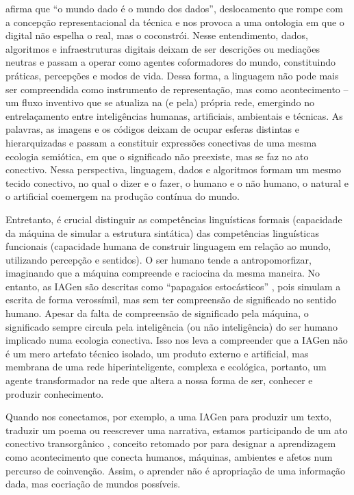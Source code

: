 \documentclass[portuguese]{textolivre}
\begin{document}
\textcite{accoto2020mundodado} afirma que “o mundo dado é o mundo dos dados”, deslocamento que rompe com a concepção representacional da técnica e nos provoca a uma ontologia em que o digital não espelha o real, mas o coconstrói. Nesse entendimento, dados, algoritmos e infraestruturas digitais deixam de ser descrições ou mediações neutras e passam a operar como agentes coformadores do mundo, constituindo práticas, percepções e modos de vida. Dessa forma, a linguagem não pode mais ser compreendida como instrumento de representação, mas como acontecimento – um fluxo inventivo que se atualiza na (e pela) própria rede, emergindo no entrelaçamento entre inteligências humanas, artificiais, ambientais e técnicas. As palavras, as imagens e os códigos deixam de ocupar esferas distintas e hierarquizadas e passam a constituir expressões conectivas de uma mesma ecologia semiótica, em que o significado não preexiste, mas se faz no ato conectivo. Nessa perspectiva, linguagem, dados e algoritmos formam um mesmo tecido conectivo, no qual o dizer e o fazer, o humano e o não humano, o natural e o artificial coemergem na produção contínua do mundo.

Entretanto, é crucial distinguir as competências linguísticas formais (capacidade da máquina de simular a estrutura sintática) das competências linguísticas funcionais (capacidade humana de construir linguagem em relação ao mundo, utilizando percepção e sentidos). O ser humano tende a antropomorfizar, imaginando que a máquina compreende e raciocina da mesma maneira. No entanto, as IAGen são descritas como “papagaios estocásticos” \cite{bender2021stochasticparrots}, pois simulam a escrita de forma verossímil, mas sem ter compreensão de significado no sentido humano. Apesar da falta de compreensão de significado pela máquina, o significado sempre circula pela inteligência (ou não inteligência) do ser humano implicado numa ecologia conectiva. Isso nos leva a compreender que a IAGen não é um mero artefato técnico isolado, um produto externo e artificial, mas membrana de uma rede hiperinteligente, complexa e ecológica, portanto, um agente transformador na rede que altera a nossa forma de ser, conhecer e produzir conhecimento.

Quando nos conectamos, por exemplo, a uma IAGen para produzir um texto, traduzir um poema ou reescrever uma narrativa, estamos participando de um ato conectivo transorgânico \cite{difelice2017netativismo}, conceito retomado por \textcite{schlemmer2023protagonismo} para designar a aprendizagem como acontecimento que conecta humanos, máquinas, ambientes e afetos num percurso de coinvenção. Assim, o aprender não é apropriação de uma informação dada, mas cocriação de mundos possíveis.
\end{document}
